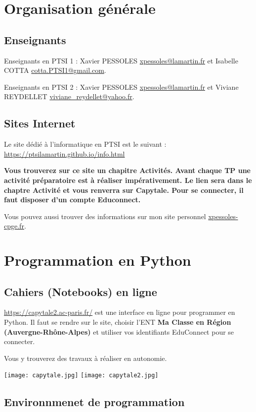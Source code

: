 \section{Organisation générale}
\subsection{Enseignants}
Enseignants en PTSI 1 : Xavier PESSOLES \url{xpessoles@lamartin.fr} et Isabelle COTTA \url{cotta.PTSI1@gmail.com}.

Enseignants en PTSI 2 : Xavier PESSOLES \url{xpessoles@lamartin.fr} et Viviane REYDELLET \url{viviane_reydellet@yahoo.fr}.

\subsection{Sites Internet}

Le site dédié à l'informatique en PTSI est le suivant :
\url{https://ptsilamartin.github.io/info.html}

\textbf{Vous trouverez sur ce site un chapitre {Activités}. Avant chaque TP une activité préparatoire est à réaliser impérativement. Le lien sera dans le chaptre Activité et vous renverra sur Capytale. Pour se connecter, il faut disposer d'un compte Educonnect.}


Vous pouvez aussi trouver des informations sur mon site personnel \url{xpessoles-cpge.fr}.
\section{Programmation en Python}
\subsection{Cahiers (Notebooks) en ligne}

\url{https://capytale2.ac-paris.fr/} est une interface en ligne pour programmer en Python.
Il faut se rendre sur le site, choisir l'ENT \textbf{Ma Classe en Région (Auvergne-Rhône-Alpes)} et utiliser vos identifiants EduConnect pour se connecter.

Vous y trouverez des travaux à réaliser en autonomie.

\begin{center}
\texttt{[image: capytale.jpg]}
\texttt{[image: capytale2.jpg]}
\end{center}

\subsection{Environnmenet de programmation}

